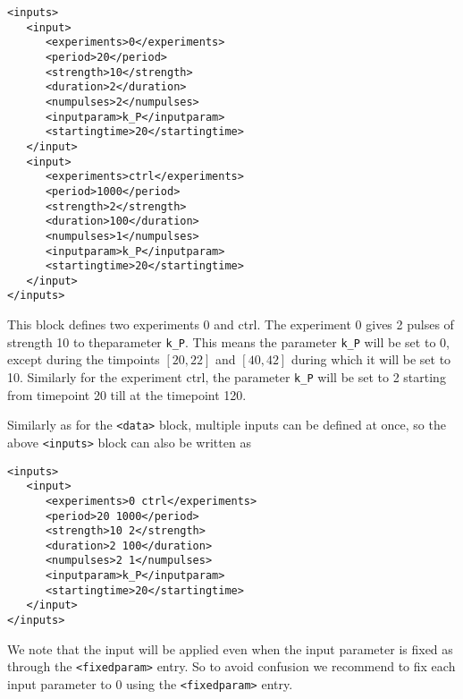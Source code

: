 \documentclass[11pt]{article} %
\begin{document}
\begin{tcolorbox}
\begin{verbatim}
<inputs>
   <input>
      <experiments>0</experiments>
      <period>20</period>
      <strength>10</strength>
      <duration>2</duration>
      <numpulses>2</numpulses>
      <inputparam>k_P</inputparam>
      <startingtime>20</startingtime>
   </input>
   <input>
      <experiments>ctrl</experiments>
      <period>1000</period>
      <strength>2</strength>
      <duration>100</duration>
      <numpulses>1</numpulses>
      <inputparam>k_P</inputparam>
      <startingtime>20</startingtime>
   </input>
</inputs>
\end{verbatim}
\end{tcolorbox}
This block defines two experiments 0 and ctrl. The experiment 0 gives 2 pulses of strength 10 to theparameter \texttt{k\_P}. This means the parameter \texttt{k\_P} will be set to 0, except during the timpoints $[20, 22]$ and $[40, 42]$ during which it will be set to 10. Similarly for the experiment ctrl, the parameter \texttt{k\_P} will be set to 2 starting from timepoint 20 till at the timepoint 120. 

Similarly as for the \texttt{<data>} block, multiple inputs can be defined at once, so the above \texttt{<inputs>} block can also be written as 

\begin{tcolorbox}
\begin{verbatim}
<inputs>
   <input>
      <experiments>0 ctrl</experiments>
      <period>20 1000</period>
      <strength>10 2</strength>
      <duration>2 100</duration>
      <numpulses>2 1</numpulses>
      <inputparam>k_P</inputparam>
      <startingtime>20</startingtime>
   </input>
</inputs>
\end{verbatim}
\end{tcolorbox}

We note that the input will be applied even when the input parameter is fixed as through the \texttt{<fixedparam>} entry. So to avoid confusion we recommend to fix each input parameter to 0 using the \texttt{<fixedparam>} entry. 
\end{document}
